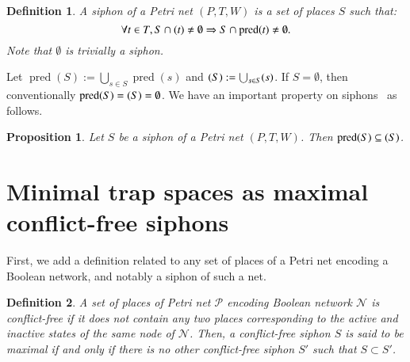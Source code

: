 \documentclass[preprint,12pt]{elsarticle}
\newtheorem{definition}{Definition}[section]
\newtheorem{proposition}{Proposition}[section]
\DeclareMathOperator{\pred}{pred}
\let\succ\relax
\DeclareMathOperator{\succ}{succ}
\begin{document}
\begin{definition}

  A \emph{siphon} of a Petri net \((P, T, W)\) is a set of places \(S\) such that:
  \[\forall t\in T, S\cap \succ(t)\not =\emptyset\Rightarrow S\cap \pred(t)\not =\emptyset.\]
  Note that \(\emptyset\) is trivially a siphon.

\end{definition}

Let \(\pred(S) := \bigcup_{s \in S}\pred(s)\) and \(\succ(S) := \bigcup_{s \in S}\succ(s)\).
If \(S = \emptyset\), then conventionally \(\pred(S) = \succ(S) = \emptyset\).
We have an important property on siphons~\cite{DBLP:journals/isci/LiuB16} as follows.

\begin{proposition}%
\label{prop:siphon_set}
  Let \(S\) be a siphon of a Petri net \((P, T, W)\).
  Then \(\pred(S) \subseteq \succ(S)\).

\end{proposition}


\section{Minimal trap spaces as maximal conflict-free siphons}%
\label{sec:Main_finding}

First, we add a definition related to any set of places of a Petri net encoding a Boolean network, and notably a siphon of such a net.

\begin{definition}

  A set of places of Petri net \(\mathcal{P}\) encoding Boolean network \(\mathcal{N}\) is \emph{conflict-free} if it does not contain any two places corresponding to the active and inactive states of the same \emph{node} of \(\mathcal{N}\).
  Then, a conflict-free siphon \(S\) is said to be \emph{maximal} if and only if there is no other conflict-free siphon \(S'\) such that \(S \subset S'\).

\end{definition}
\end{document}
